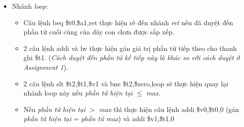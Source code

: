\documentclass[12pt,a4paper,oneside]{article}
\begin{document}
\begin{itemize}
\begin{itemize}
	    \item Nhánh \textit{loop}:
	    		\begin{itemize}
	    		\item Câu lệnh \colorbox{code}{beq \$t0,\$a1,ret} thực hiện rẽ đến nhánh \textit{ret} nếu đã duyệt đến phần tử cuối cùng của dãy con chưa được sắp xếp.
	    		\item 2 câu lệnh \colorbox{code}{addi} và \colorbox{code}{lw} thực hiện gán giá trị phần tử tiếp theo cho thanh ghi \$t1. (\textit{Cách duyệt đến phần tử kế tiếp này là khác so với cách duyệt ở Assignment 1}).
	    		\item 2 câu lệnh \colorbox{code}{slt \$t2,\$t1,\$v1} và \colorbox{code}{bne \$t2,\$zero,loop} sẽ thực hiện quay lại nhánh loop này nếu \textit{phần tử hiện tại} $\leq$ \textit{max}.
	    		\item Nếu \textit{phần tử hiện tại} $>$ \textit{max} thì thực hiện câu lệnh \colorbox{code}{addi \$v0,\$t0,0} (gán \textit{phần tử hiện tại} = \textit{phần tử max}) và \colorbox{code}{addi \$v1,\$t1,0}
	    		\end{itemize}
	\end{itemize}
\end{itemize}
\end{document}
